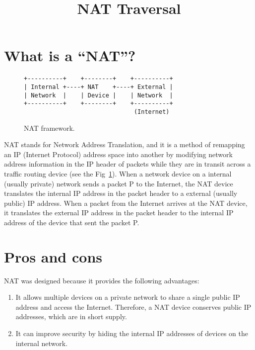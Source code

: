 
\title{NAT Traversal}

\maketitle

\section{What is a ``NAT''?}

\begin{figure}
\begin{verbatim}
+----------+    +--------+    +----------+
| Internal +----+ NAT    +----+ External |
| Network  |    | Device |    | Network  |
+----------+    +--------+    +----------+
                               (Internet)
\end{verbatim}
\caption{NAT framework.}
\label{fig:NAT_framework}
\end{figure}

NAT stands for Network Address Translation, and it is a method of
remapping an IP (Internet Protocol) address space into another by
modifying network address information in the IP header of packets
while they are in transit across a traffic routing device (see the
Fig~\ref{fig:NAT_framework}). When a network device on a internal
(usually private) network sends a packet P to the Internet, the NAT
device translates the internal IP address in the packet header to a
external (usually public) IP address. When a packet from the Internet
arrives at the NAT device, it translates the external IP address in
the packet header to the internal IP address of the device that sent
the packet P.

\section{Pros and cons}

NAT was designed because it provides the following advantages:
\begin{enumerate}
\item It allows multiple devices on a private network to share a
  single public IP address and access the Internet. Therefore, a NAT
  device conserves public IP addresses, which are in short supply.
\item It can improve security by hiding the internal IP addresses of
  devices on the internal network.
\end{enumerate}

